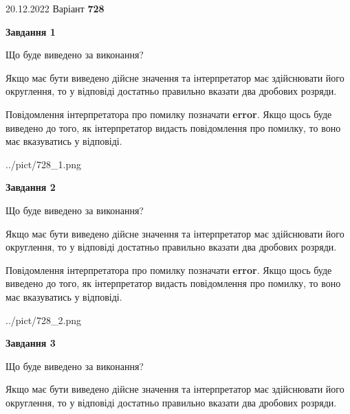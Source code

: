 \documentclass[12pt, ukrainian]{article}
\begin{document}
{20.12.2022 Варіант \No \textbf { 728 }\par}
{
\begin {Large}

{\begin {center}\textbf{Завдання 1}\end {center}}\par
Що буде виведено за виконання? \par

Якщо має бути виведено дійсне значення та інтерпретатор має здійснювати його округлення, 
то у відповіді достатньо правильно вказати два дробових розряди.

Повідомлення інтерпретатора про помилку позначати \textbf{error}.
Якщо щось буде виведено до того, як інтерпретатор видасть повідомлення про помилку, 
то воно має вказуватись у відповіді. \par

\begin{center}
	{../pict/728_1.png}
\end{center}
\newpage

{\begin {center}\textbf{Завдання 2}\end {center}}\par
Що буде виведено за виконання? \par

Якщо має бути виведено дійсне значення та інтерпретатор має здійснювати його округлення, 
то у відповіді достатньо правильно вказати два дробових розряди.

Повідомлення інтерпретатора про помилку позначати \textbf{error}.
Якщо щось буде виведено до того, як інтерпретатор видасть повідомлення про помилку, 
то воно має вказуватись у відповіді. \par

\begin{center}
	{../pict/728_2.png}
\end{center}
\newpage

{\begin {center}\textbf{Завдання 3}\end {center}}\par
Що буде виведено за виконання? \par

Якщо має бути виведено дійсне значення та інтерпретатор має здійснювати його округлення, 
то у відповіді достатньо правильно вказати два дробових розряди.


\end{Large}}
\end{document}
